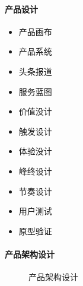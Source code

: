 \documentclass[letterpaper,10pt,english]{sphinxmanual}
\begin{document}
\paragraph{产品设计}
\label{\detokenize{chapter_idea/design:id18}}\begin{itemize}
\item {} 
产品画布

\item {} 
产品系统

\item {} 
头条报道

\item {} 
服务蓝图

\item {} 
价值没计

\item {} 
触发设计

\item {} 
体验没计

\item {} 
峰终设计

\item {} 
节奏设计

\item {} 
用户测试

\item {} 
原型验证

\end{itemize}


\paragraph{产品架构设计}
\label{\detokenize{chapter_idea/design:id19}}
\begin{figure}[H]
\centering
\capstart

\noindent{}
\caption{产品架构设计\sphinxfootnotemark[460]}\label{\detokenize{chapter_idea/design:id21}}\end{figure}
%
\begin{footnotetext}[460]\sphinxAtStartFootnote
{}
%
\end{footnotetext}\ignorespaces 
\end{document}
